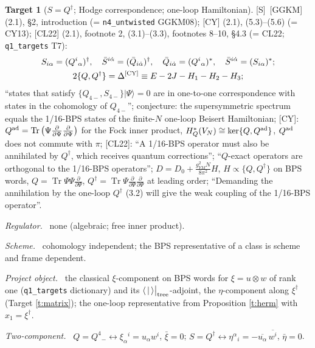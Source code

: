 \documentclass[11pt]{article}
\theoremstyle{definition}
\newtheorem{target}{Target}
\newcommand{\Tr}{\operatorname{Tr}}
\newcommand{\Sl}{\textup{[S]}}
\newcommand{\tree}{\big|_{\rm tree}}
\newcommand{\fld}[1]{\par\textit{#1.}\ }
\begin{document}
\begin{target}[$S=Q^\dagger$; Hodge correspondence; one-loop Hamiltonian]\label{t:ggkm}
\Sl\ [GGKM] (2.1), \S2, introduction (= \texttt{n4\_untwisted} GGKM08); [CY] (2.1), (5.3)--(5.6) (= CY13); [CL22] (2.1), footnote 2, (3.1)--(3.3), footnotes 8--10, \S4.3 (= CL22; \texttt{q1\_targets} T7):
\[
\begin{gathered}
S_{i\alpha}=(Q^i{}_\alpha)^\dagger,\quad \bar S^{i\dot\alpha}=(\bar Q_{i\dot\alpha})^\dagger,\quad \bar Q_{i\dot\alpha}=(Q^i{}_\alpha)^*,\quad \bar S^{i\dot\alpha}=(S_{i\alpha})^*;\\
2\{Q,Q^\dagger\}=\Delta^{\rm[CY]}\equiv E-2J-H_1-H_2-H_3 ;
\end{gathered}
\]
``states that satisfy $\{Q_{4-},S_{4-}\}|\Psi\rangle=0$ are in one-to-one correspondence with states in the cohomology of $Q_{4-}$''; conjecture: the supersymmetric spectrum equals the 1/16-BPS states of the finite-$N$ one-loop Beisert Hamiltonian; [CY]: $Q^{\rm ad}=\Tr\big(\Psi\frac\partial{\partial\Psi}\frac\partial{\partial\Psi}\big)$ for the Fock inner product, $H^*_Q(V_N)\cong\ker\{Q,Q^{\rm ad}\}$, $Q^{\rm ad}$ does not commute with $\pi$; [CL22]: ``A 1/16-BPS operator must also be annihilated by $Q^\dagger$, which receives quantum corrections''; ``$Q$-exact operators are orthogonal to the 1/16-BPS operators''; $D=D_0+\frac{g_{YM}^2N}{8\pi^2}H$, $H\propto\{Q,Q^\dagger\}$ on BPS words, $Q=\Tr\Psi\Psi\frac\partial{\partial\Psi}$, $Q^\dagger=\Tr\Psi\frac\partial{\partial\Psi}\frac\partial{\partial\Psi}$ at leading order; ``Demanding the annihilation by the one-loop $Q^\dagger$ (3.2) will give the weak coupling of the 1/16-BPS operator''.
\fld{Regulator} none (algebraic; free inner product). \fld{Scheme} cohomology independent; the BPS representative of a class is scheme and frame dependent.
\fld{Project object} the classical $\xi$-component on BPS words for $\xi=u\otimes w$ of rank one (\texttt{q1\_targets} dictionary) and its $\langle\,|\,\rangle\tree$-adjoint, the $\eta$-component along $\xi^\dagger$ (Target \ref{t:matrix}); the one-loop representative from Proposition \ref{t:herm} with $x_1=\xi^\dagger$.
\fld{Two-component} $Q=Q^4{}_-\leftrightarrow\xi_\alpha{}^i=u_\alpha w^i$, $\bar\xi=0$; $S=Q^\dagger\leftrightarrow\eta^\alpha{}_i=-\overline{u_\alpha}\,\overline{w^i}$, $\bar\eta=0$.
\end{target}
\end{document}
